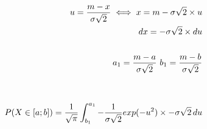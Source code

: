 \documentclass[preview]{standalone}
\begin{document}
\begin{align*}
u = {{m - x} \over {\sigma \sqrt{2}} } \iff x = m - \sigma \sqrt{2} \times u \\ dx = - \sigma \sqrt{2} \times du \\ \\ a_1 = {{m - a} \over {\sigma \sqrt{2}} } \, \,b_1 = {{m - b} \over {\sigma \sqrt{2}} } \\ \\ \\ P( X \in [a;b] ) = { \frac{1}{\sqrt{\pi}} } \int_{b_1}^{a_1} { { - \frac{1}{\sigma \sqrt{2}} } exp( -u^2 ) \times - \sigma \sqrt{2} } \, du
\end{align*}
\end{document}
